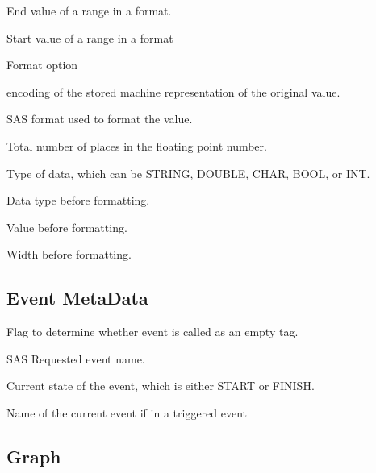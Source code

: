 \begin{description}
End value of a range in a format.

Start value of a range in a format

Format option

encoding of the stored machine representation of the original value.

SAS format used to format the value.

Total number of places in the floating point number.

Type of data, which can be STRING, DOUBLE, CHAR, BOOL, or INT.

Data type before formatting.

Value before formatting.

Width before formatting.

\end{description}

\subsection{Event MetaData}


\begin{description}

Flag to determine whether event is called as an empty tag.

SAS Requested event name.

Current state of the event, which is either START or FINISH.

Name of the current event if in a triggered event

\end{description}

\subsection{Graph}

